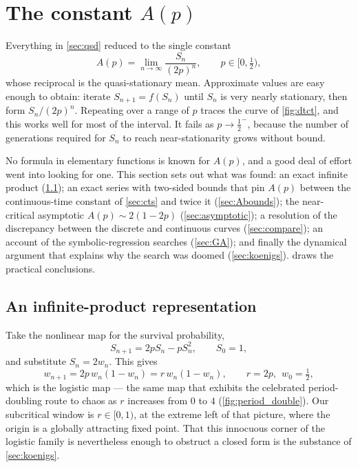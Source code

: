 \section{The constant \texorpdfstring{$A(p)$}{A(p)}}
\label{sec:Ap}

Everything in \cref{sec:qsd} reduced to the single constant
\begin{equation}
\label{eq:Ap-def}
A(p) = \lim_{n\to\infty}\frac{S_n}{(2p)^n},\qquad p\in[0,\tfrac12),
\end{equation}
whose reciprocal is the quasi-stationary mean. Approximate values are easy enough to
obtain: iterate $S_{n+1} = f(S_n)$ until $S_n$ is very nearly stationary, then form
$S_n/(2p)^n$. Repeating over a range of $p$ traces the curve of \cref{fig:dtct}, and
this works well for most of the interval. It fails as $p\to\tfrac12^-$, because the
number of generations required for $S_n$ to reach near-stationarity grows without
bound.

No formula in elementary functions is known for $A(p)$, and a good deal of effort
went into looking for one. This section sets out what was found: an exact infinite
product (\cref{sec:product}); an exact series with two-sided bounds that pin $A(p)$
between the continuous-time constant of \cref{sec:cts} and twice it
(\cref{sec:Abounds}); the near-critical asymptotic $A(p)\sim2(1-2p)$
(\cref{sec:asymptotic}); a resolution of the discrepancy between the discrete and
continuous curves (\cref{sec:compare}); an account of the symbolic-regression
searches (\cref{sec:GA}); and finally the dynamical argument that explains why the
search was doomed (\cref{sec:koenigs}).  draws the practical
conclusions.

\subsection{An infinite-product representation}
\label{sec:product}

Take the nonlinear map for the survival probability,
\begin{equation*}
S_{n+1} = 2pS_n - pS_n^2,\qquad S_0=1,
\end{equation*}
and substitute $S_n = 2w_n$. This gives
\begin{equation}
\label{eq:logistic}
w_{n+1} = 2p\,w_n(1-w_n) = r\,w_n(1-w_n),\qquad r = 2p,\ \ w_0 = \tfrac12 ,
\end{equation}
which is the logistic map --- the same map that exhibits the celebrated
period-doubling route to chaos as $r$ increases from $0$ to $4$
(\cref{fig:period_double}). Our subcritical window is $r\in[0,1)$, at the extreme
left of that picture, where the origin is a globally attracting fixed point. That
this innocuous corner of the logistic family is nevertheless enough to obstruct a
closed form is the substance of \cref{sec:koenigs}.

